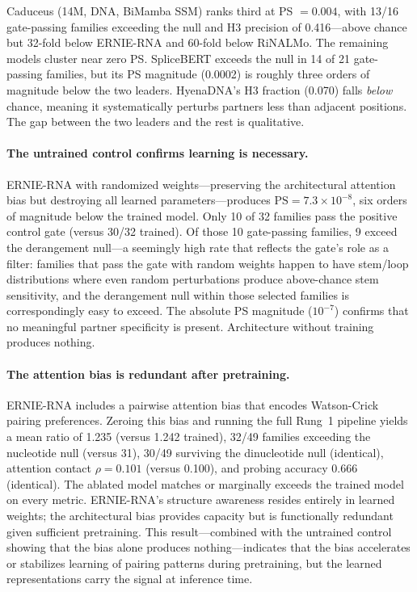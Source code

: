 \documentclass[11pt]{article}
\begin{document}
Caduceus (14M, DNA, BiMamba SSM) ranks third at PS $= 0.004$, with
13/16 gate-passing families exceeding the null and H3 precision of
0.416---above chance but 32-fold below ERNIE-RNA and 60-fold below
RiNALMo. The remaining models cluster near zero PS. SpliceBERT
exceeds the null in 14 of 21 gate-passing families, but its PS
magnitude (0.0002) is roughly three orders of magnitude below the two
leaders. HyenaDNA's H3 fraction (0.070) falls \emph{below} chance,
meaning it systematically perturbs partners less than adjacent
positions. The gap between the two leaders and the rest is
qualitative.

\paragraph{The untrained control confirms learning is necessary.}
ERNIE-RNA with randomized weights---preserving the architectural
attention bias but destroying all learned parameters---produces
$\text{PS} = 7.3 \times 10^{-8}$, six orders of magnitude below
the trained model. Only 10 of 32 families pass the positive control
gate (versus 30/32 trained). Of those 10 gate-passing families,
9 exceed the derangement null---a seemingly high rate that reflects
the gate's role as a filter: families that pass the gate with random
weights happen to have stem/loop distributions where even random
perturbations produce above-chance stem sensitivity, and the
derangement null within those selected families is correspondingly
easy to exceed. The absolute PS magnitude ($10^{-7}$) confirms that
no meaningful partner specificity is present. Architecture without
training produces nothing.

\paragraph{The attention bias is redundant after pretraining.}
ERNIE-RNA includes a pairwise attention bias that encodes
Watson-Crick pairing preferences. Zeroing this bias and running the
full Rung~1 pipeline yields a mean ratio of 1.235 (versus 1.242
trained), 32/49 families exceeding the nucleotide null (versus 31),
30/49 surviving the dinucleotide null (identical), attention contact
$\rho = 0.101$ (versus 0.100), and probing accuracy 0.666
(identical). The ablated model matches or marginally exceeds the trained model on
every metric. ERNIE-RNA's structure awareness resides entirely in learned
weights; the architectural bias provides capacity but is functionally
redundant given sufficient pretraining. This result---combined with the
untrained control showing that the bias alone produces nothing---indicates
that the bias accelerates or stabilizes learning of pairing patterns
during pretraining, but the learned representations carry the signal
at inference time.
\end{document}
